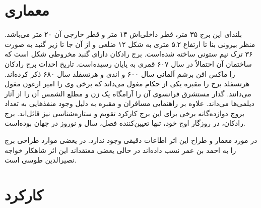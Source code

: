 \documentclass{article}
\begin{document}
\section{معماری}
بلندای این برج ۳۵ متر، قطر داخلی‌اش ۱۴ متر و قطر خارجی آن ۲۰ متر می‌باشد. منظر بیرونی بنا تا ارتفاع ۵.۲ متری به شکل ۱۲ ضلعی و از آن جا تا زیر گنبد به صورت ۳۶ ترک نیم ستونی ساخته شده‌است. برج رادکان دارای گنبد مخروطی شکل است که ساختمان آن احتمالاً در سال ۶۰۷ قمری به پایان رسیده‌است. تاریخ احداث برج رادکان را ماکس افن برشم آلمانی سال ۶۰۰ و اندی و هرتسفلد سال ۶۸۰ ذکر کرده‌اند. هرتسفلد برج را مقبره یکی از حکام مغول می‌داند که برخی وی را امیر ارغون مغول می‌دانند. گدار مستشرق فرانسوی آن را آرامگاه یک زن و مطلع الشمس آن را از آثار دیلمی‌ها می‌داند. علاوه بر راهنمایی مسافران و مقبره به دلیل وجود منفذهایی به تعداد بروج دوازده‌گانه برخی برای این برج کارکرد تقویم و ستاره‌شناسی نیز قائل‌اند. برج رادکان، در روزگار اوج خود، تنها تعیین‌کننده فصل، سال و نوروز در جهان بوده‌است.

در مورد معمار و طراح این اثر اطاعات دقیقی وجود ندارد. در یعضی موارد طراحی برج را به احمد بن عمر نسب داده‌اند در حالی یعضی معتقداند این اثر شاهکار  خواجه نصیرالدین طوسی است.

\section{کارکرد}
\end{document}
